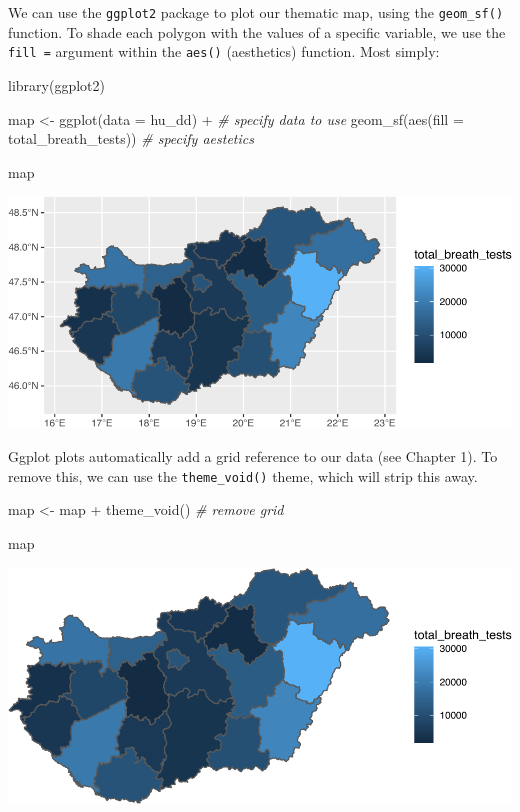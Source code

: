 \documentclass[
  krantz2]{krantz}
\makeatletter
\newenvironment{Shaded}{\begin{snugshade}}{\end{snugshade}}
\newcommand{\AttributeTok}[1]{\textcolor[rgb]{0.61,0.61,0.61}{#1}}
\newcommand{\CommentTok}[1]{\textcolor[rgb]{0.37,0.37,0.37}{\textit{#1}}}
\newcommand{\FunctionTok}[1]{\textcolor[rgb]{0,0,0}{#1}}
\newcommand{\NormalTok}[1]{#1}
\newcommand{\OtherTok}[1]{\textcolor[rgb]{0.37,0.37,0.37}{#1}}
\newcommand{\SpecialCharTok}[1]{\textcolor[rgb]{0,0,0}{#1}}
\newenvironment{kframe}{%
\medskip{}
\setlength{\fboxsep}{.8em}
 \def\at@end@of@kframe{}%
 \ifinner\ifhmode%
  \def\at@end@of@kframe{\end{minipage}}%
  \begin{minipage}{\columnwidth}%
 \fi\fi%
 \def\FrameCommand##1{\hskip\@totalleftmargin \hskip-\fboxsep
 \colorbox{shadecolor}{##1}\hskip-\fboxsep
     \hskip-\linewidth \hskip-\@totalleftmargin \hskip\columnwidth}%
 \MakeFramed {\advance\hsize-\width
   \@totalleftmargin\z@ \linewidth\hsize
   \@setminipage}}%
 {\par\unskip\endMakeFramed%
 \at@end@of@kframe}
\renewenvironment{Shaded}{\begin{kframe}}{\end{kframe}}
\makeatother
\begin{document}
We can use the \texttt{ggplot2} package to plot our thematic map, using the \texttt{geom\_sf()} function. To shade each polygon with the values of a specific variable, we use the \texttt{fill\ =} argument within the \texttt{aes()} (aesthetics) function. Most simply:

\begin{Shaded}
\begin{Highlighting}[]
\FunctionTok{library}\NormalTok{(ggplot2)}

\NormalTok{map }\OtherTok{\textless{}{-}} \FunctionTok{ggplot}\NormalTok{(}\AttributeTok{data =}\NormalTok{ hu\_dd) }\SpecialCharTok{+} \CommentTok{\# specify data to use}
  \FunctionTok{geom\_sf}\NormalTok{(}\FunctionTok{aes}\NormalTok{(}\AttributeTok{fill =}\NormalTok{ total\_breath\_tests)) }\CommentTok{\# specify aestetics }

\NormalTok{map}
\end{Highlighting}
\end{Shaded}

\includegraphics{crime_mapping_files/figure-latex/themmap-1.pdf}

Ggplot plots automatically add a grid reference to our data (see Chapter 1). To remove this, we can use the \texttt{theme\_void()} theme, which will strip this away.

\begin{Shaded}
\begin{Highlighting}[]
\NormalTok{map }\OtherTok{\textless{}{-}}\NormalTok{ map }\SpecialCharTok{+} 
  \FunctionTok{theme\_void}\NormalTok{()  }\CommentTok{\# remove grid }

\NormalTok{map}
\end{Highlighting}
\end{Shaded}

\includegraphics{crime_mapping_files/figure-latex/themmapthemevoid-1.pdf}
\end{document}
